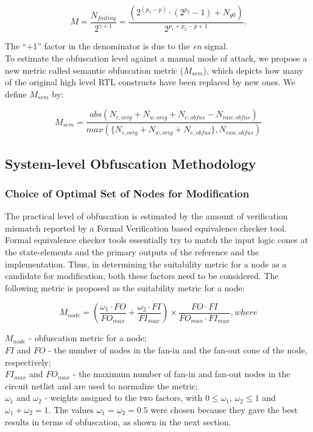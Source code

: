 \documentclass{optica-article}
\begin{document}
\begin{equation}
    \label{equation:3}
    M=\frac{N_{failing}}{2^{\gamma+1}} =\frac{(2^{(p_1- p)}\cdot(2^{p_2} - 1)+N_{g0})}{2^{p_1+p_2-p+1}}.
\end{equation}

\indent The “+1” factor in the denominator is due to the \textit{en} signal.\\
\indent To estimate the obfuscation level against a manual mode of attack, we propose a new metric called semantic obfuscation metric ($M_{sem}$), which depicts how many of the original high level RTL constructs have been replaced by new ones. We define $M_{sem}$ by:

\begin{equation} %
    \label{equation:4}
    M_{sem}=\frac{abs(N_{c,orig}+N_{w,orig}+N_{e,obfus}-N_{raw,obfus})}{max(\{N_{c,orig}+N_{w,orig}+N_{e,obfus}\},N_{raw,obfus})}
\end{equation}


\subsection{System-level Obfuscation Methodology}

\subsubsection{Choice of Optimal Set of Nodes for Modification}

The practical level of obfuscation is estimated by the amount of verification mismatch reported by a Formal Verification based equivalence checker tool. Formal equivalence checker tools essentially try to match the input logic cones at the state-elements and the primary outputs of the reference and the implementation. Thus, in determining the suitability metric for a node as a candidate for modification, both these factors need to be considered. The following metric is proposed as the suitability metric for a node:

\begin{equation} %
    M_{node}=\left(\frac{\omega_1\cdot FO}{FO_{max}}+\frac{\omega_2\cdot FI}{FI_{max}}\right)\times\frac{FO\cdot FI}{FO_{max}\cdot FI_{max}},
    where
\end{equation}

$M_{node}$ - obfuscation metric for a node;\\
$FI$ and $FO$ - the number of nodes in the fan-in and the fan-out cone of the node, respectively;\\
$FI_{max}$ and $FO_{max}$ - the maximum number of fan-in and fan-out nodes in the circuit netlist and are used to normalize the metric;\\
$\omega_1$ and $\omega_2$ - weights assigned to the two factors, with $0\leq\omega_1$, $\omega_2\leq1$ and $\omega_1 + \omega_2 = 1$. The values $\omega_1 = \omega_2 = 0.5$ were chosen because they gave the best results in terms of obfuscation, as shown in the next section.
\end{document}
